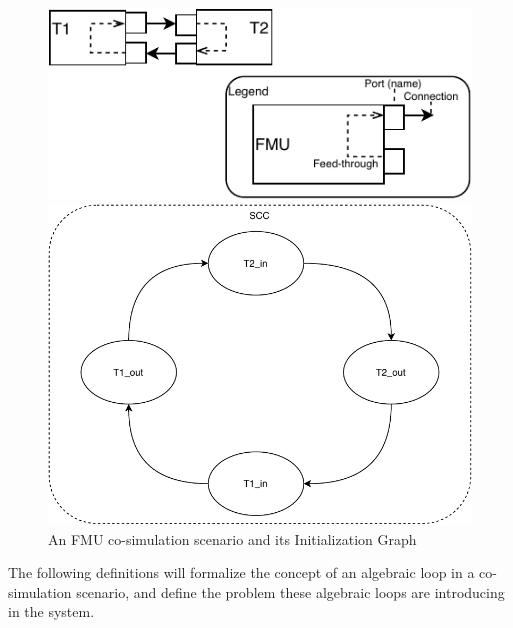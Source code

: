\begin{figure}[H]
    \centering
    \begin{minipage}{0.55\textwidth}
        \centering
    \includegraphics[width=1\textwidth]{images/fmu_cycle.pdf}
    \end{minipage}\hfill
    \begin{minipage}{0.35\textwidth}
        \centering
    \includegraphics[width=1\textwidth]{images/SCC.pdf}
    \end{minipage}
    \caption{An FMU co-simulation scenario and its Initialization Graph}
    \label{fig:fmu_cycle}
\end{figure}






The following definitions will formalize the concept of an algebraic loop in a co-simulation scenario, and define the problem these algebraic loops are introducing in the system. 

